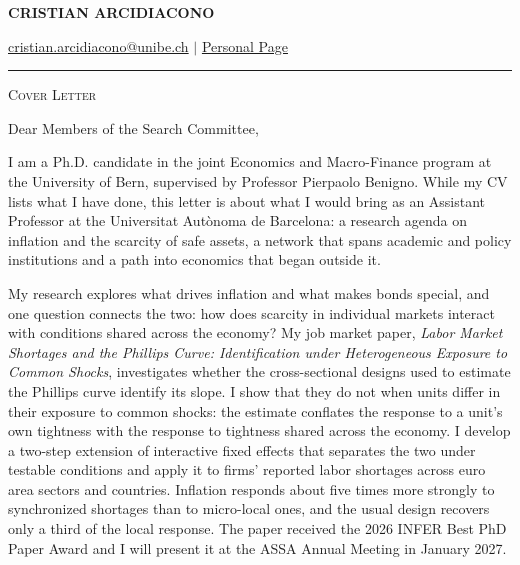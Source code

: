 \documentclass[11pt]{article}
\begin{document}
 
\begin{center}
    \textbf{\large \scshape CRISTIAN ARCIDIACONO}
\end{center}

\begin{center}
    {\href{mailto:cristian.arcidiacono@unibe.ch}{cristian.arcidiacono@unibe.ch} $\vert$ \href{https://sites.google.com/view/cristian-arcidiacono/home}{Personal Page}}
\end{center}
\vspace{-0.2cm}
\noindent\rule{\textwidth}{0.4pt}

\vspace{0.2cm}

\begin{center}
    {\large \scshape Cover Letter}
\end{center}

\vspace{0.3cm}

Dear Members of the Search Committee,

I am a Ph.D. candidate in the joint Economics and Macro-Finance program at the University of Bern, supervised by Professor Pierpaolo Benigno. While my CV lists what I have done, this letter is about what I would bring as an Assistant Professor at the Universitat Autònoma de Barcelona: a research agenda on inflation and the scarcity of safe assets, a network that spans academic and policy institutions and a path into economics that began outside it.

My research explores what drives inflation and what makes bonds special, and one question connects the two: how does scarcity in individual markets interact with conditions shared across the economy? My job market paper, \textit{Labor Market Shortages and the Phillips Curve: Identification under Heterogeneous Exposure to Common Shocks}, investigates whether the cross-sectional designs used to estimate the Phillips curve identify its slope. I show that they do not when units differ in their exposure to common shocks: the estimate conflates the response to a unit's own tightness with the response to tightness shared across the economy. I develop a two-step extension of interactive fixed effects that separates the two under testable conditions and apply it to firms' reported labor shortages across euro area sectors and countries. Inflation responds about five times more strongly to synchronized shortages than to micro-local ones, and the usual design recovers only a third of the local response. The paper received the 2026 INFER Best PhD Paper Award and I will present it at the ASSA Annual Meeting in January 2027.
\end{document}
